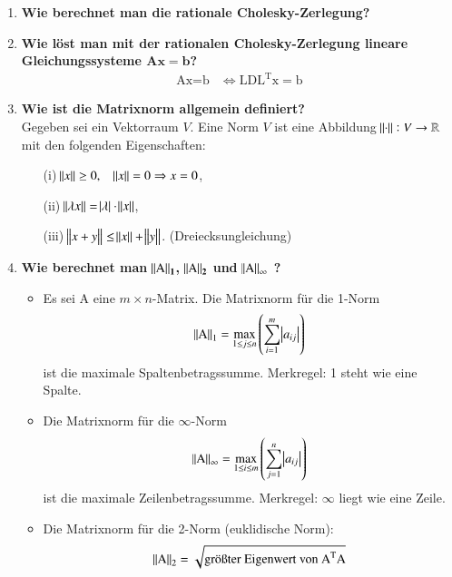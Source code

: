 \begin{enumerate}
		\item \textbf{Wie berechnet man die rationale Cholesky-Zerlegung?} \\
			
		
		\item \textbf{Wie löst man mit der rationalen Cholesky-Zerlegung lineare Gleichungssysteme \(\mathbf{Ax=b}\)?}
			\begin{align*}
				\text{Ax}=\text{b}&\Longleftrightarrow \text{LDL}^\text{T}\text{x}=\text{b}
			\end{align*}
		
		\item \textbf{Wie ist die Matrixnorm allgemein definiert?} \\
			Gegeben sei ein Vektorraum \(V\). Eine Norm \(V\) ist eine Abbildung \(\norm{\cdot}:V\rightarrow\mathbb{R}\) mit den folgenden Eigenschaften:
			\begin{itemize}
				\item[(i)] \(\norm{x}\geq 0,\quad \norm{x}=0\Rightarrow x=0\),
				\item[(ii)] \(\norm{\lambda x}=\abs{\lambda}\cdot\norm{x}\),
				\item[(iii)] \(\norm{x+y}\leq\norm{x}+\norm{y}\). (Dreiecksungleichung)
			\end{itemize}
		
		\pagebreak
		
			\item \textbf{Wie berechnet man \(\mathbf{\norm{\text{A}}_1}\), \(\mathbf{\norm{\text{A}}_2}\) und \(\mathbf{\norm{\text{A}}_\infty}\) ?} \\
			\begin{itemize}
				\item Es sei A eine \(m\times n\)-Matrix.
					Die Matrixnorm für die 1-Norm
					\begin{align*}
						\norm{\text{A}}_1=\underset{1\leq j\leq n}{\max}\left( \sum_{i=1}^{m}\abs{a_{ij}}\right) 
					\end{align*}
					ist die maximale Spaltenbetragssumme. Merkregel: 1 steht wie eine Spalte.
				\item Die Matrixnorm für die \(\infty\)-Norm
					\begin{align*}
						\norm{\text{A}}_\infty=\underset{1\leq i\leq m}{\max}\left( \sum_{j=1}^{n}\abs{a_{ij}}\right)
					\end{align*}
					ist die maximale Zeilenbetragssumme. Merkregel: \(\infty\) liegt wie eine Zeile.
				\item Die Matrixnorm für die 2-Norm (euklidische Norm):
					\begin{align*}
						\norm{\text{A}}_2=\sqrt{\text{größter Eigenwert von A}^\text{T}\text{A}}
					\end{align*}
			\end{itemize}		
			

\end{enumerate}
